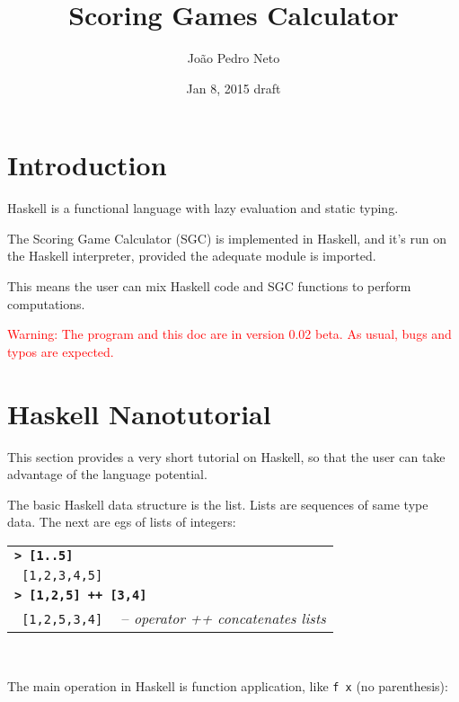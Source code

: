 \documentclass[a4paper,12pt]{article}
\newcommand{\bash}[1]{\small\textbf{\lstinline§> #1§}\\}
\newcommand{\out}[1]{\small\lstinline§ #1§}
\newcommand{\hsklcmt}[1]{~~-- \footnotesize\textit{#1}}
\newcommand{\haskellCode}{\fontfamily{pcr}\selectfont}
\newenvironment{sgcode}
	{ \haskellCode
	  \begin{tabular}{|p{0.9\textwidth}|}
      \hline	
	}
	{ \\\hline  
      \end{tabular} \\
	  \par 
	}
\begin{document}
\title{Scoring Games Calculator}
\author{Jo\~{a}o Pedro Neto}
\date{Jan 8, 2015 draft}
\maketitle

\newpage
%
%

\tableofcontents

\newpage \section*{Introduction}

Haskell is a functional language with lazy evaluation and static typing.

The Scoring Game Calculator (SGC) is implemented in Haskell, and it's run on 
the Haskell interpreter, provided the adequate module is imported. 

This means the user can mix Haskell code and SGC functions to perform computations.

\textcolor{red}{Warning: The program and this doc are in version 0.02 beta. As usual, bugs and typos are expected.}

\section{Haskell Nanotutorial}

This section provides a very short tutorial on Haskell, so that the user can
take advantage of the language potential.

The basic Haskell data structure is the list. Lists are sequences of
same type data. The next are egs of lists of integers:

\begin{sgcode}
\bash{[1..5]}
\out{[1,2,3,4,5]} \\
\bash{[1,2,5] ++ [3,4]} 
\out{[1,2,5,3,4]} \hsklcmt{operator ++ concatenates lists}
\end{sgcode}

The main operation in Haskell is function application, like \verb|f x| (no parenthesis):
\end{document}
